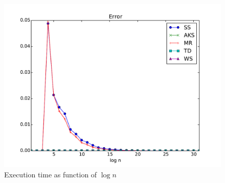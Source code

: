 \begin{figure}
        \centering
        \includegraphics[width=\columnwidth]{results/performance.pdf}
        \caption{Execution time as function of $\log n$}
        \label{fig:results}
\end{figure}










